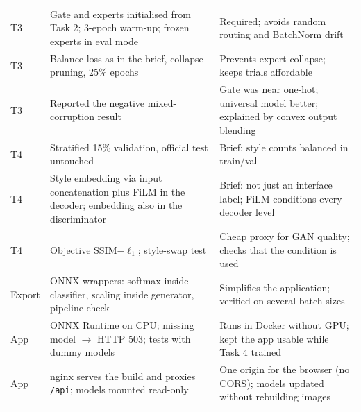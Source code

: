 \documentclass[conference]{IEEEtran}
\begin{document}
\begin{table}[t]
\begin{tabular}{@{}lp{6.4cm}p{8.6cm}@{}}
T3 & Gate and experts initialised from Task 2; 3-epoch warm-up; frozen experts in eval mode & Required; avoids random routing and BatchNorm drift\\
T3 & Balance loss as in the brief, collapse pruning, 25\% epochs & Prevents expert collapse; keeps trials affordable\\
T3 & Reported the negative mixed-corruption result & Gate was near one-hot; universal model better; explained by convex output blending\\
T4 & Stratified 15\% validation, official test untouched & Brief; style counts balanced in train/val\\
T4 & Style embedding via input concatenation plus FiLM in the decoder; embedding also in the discriminator & Brief: not just an interface label; FiLM conditions every decoder level\\
T4 & Objective SSIM$-\ell_1$; style-swap test & Cheap proxy for GAN quality; checks that the condition is used\\
Export & ONNX wrappers: softmax inside classifier, scaling inside generator, pipeline check & Simplifies the application; verified on several batch sizes\\
App & ONNX Runtime on CPU; missing model $\to$ HTTP 503; tests with dummy models & Runs in Docker without GPU; kept the app usable while Task 4 trained\\
App & nginx serves the build and proxies \texttt{/api}; models mounted read-only & One origin for the browser (no CORS); models updated without rebuilding images\\
\bottomrule
\end{tabular}
\end{table}
\end{document}
